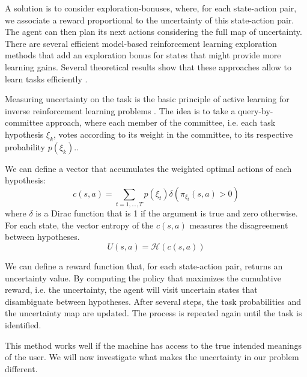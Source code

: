 A solution is to consider exploration-bonuses, where, for each state-action pair, we associate a reward proportional to the uncertainty of this state-action pair. The agent can then plan its next actions considering the full map of uncertainty. There are several efficient model-based reinforcement learning exploration methods that add an exploration bonus for states that might provide more learning gains. Several theoretical results show that these approaches allow to learn tasks efficiently \cite{brafman2003r,kolter2009near}.


Measuring uncertainty on the task is the basic principle of active learning for inverse reinforcement learning problems \cite{macl09airl}. The idea is to take a query-by-committee approach, where each member of the committee, i.e. each task hypothesis $\xi_k$, votes according to its weight in the committee, to its respective probability $p(\xi_k)$.. 

We can define a vector that accumulates the weighted optimal actions of each hypothesis: 
%
\[
c(s,a) = \sum_{t = 1, \ldots, T} p(\xi_t) \delta(\pi_{\xi_t}(s,a) > 0)
\]
%
where $\delta$ is a Dirac function that is 1 if the argument is true and zero otherwise. For each state, the vector entropy of the $c(s,a)$ measures the disagreement between hypotheses.
%
\[
U(s,a) = \mathcal{H}(c(s,a))
\]
%

We can define a reward function that, for each state-action pair, returns an uncertainty value. By computing the policy that maximizes the cumulative reward, i.e. the uncertainty, the agent will visit uncertain states that disambiguate between hypotheses. After several steps, the task probabilities and the uncertainty map are updated. The process is repeated again until the task is identified.

This method works well if the machine has access to the true intended meanings of the user. We will now investigate what makes the uncertainty in our problem different.

